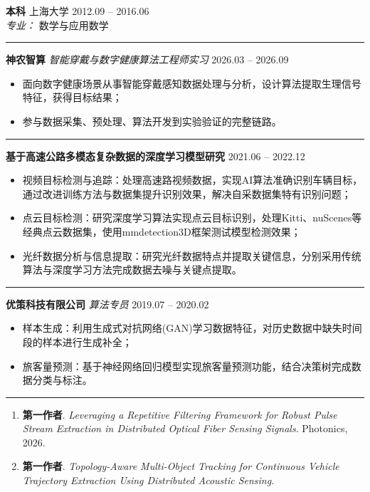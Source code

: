 \documentclass[10pt,a4paper]{ctexart}
\newcommand{\sectiontitle}[1]{\noindent{\large\bfseries\color{mainblue}#1}\vspace{0.2em}\hrule\vspace{0.35em}}
\begin{document}
\noindent
\textbf{本科} \quad 上海大学 \hfill 2012.09 -- 2016.06 \\
\textit{专业：} 数学与应用数学 \\

\sectiontitle{实习经历}
\noindent
\textbf{神农智算} \quad \textit{智能穿戴与数字健康算法工程师实习} \hfill 2026.03 -- 2026.09 \\
\begin{itemize}
\item 面向数字健康场景从事智能穿戴感知数据处理与分析，设计算法提取生理信号特征，获得目标结果；
\item 参与数据采集、预处理、算法开发到实验验证的完整链路。
\end{itemize}

\sectiontitle{科研经历}
\noindent
\textbf{基于高速公路多模态复杂数据的深度学习模型研究} \hfill 2021.06 -- 2022.12 \\
\begin{itemize}
\item 视频目标检测与追踪：处理高速路视频数据，实现AI算法准确识别车辆目标，通过改进训练方法与数据集提升识别效果，解决自采数据集特有识别问题；
\item 点云目标检测：研究深度学习算法实现点云目标识别，处理Kitti、nuScenes等经典点云数据集，使用mmdetection3D框架测试模型检测效果；
\item 光纤数据分析与信息提取：研究光纤数据特点并提取关键信息，分别采用传统算法与深度学习方法完成数据去噪与关键点提取。
\end{itemize}

\sectiontitle{工作经历}
\noindent
\textbf{优策科技有限公司} \quad \textit{算法专员} \hfill 2019.07 -- 2020.02 \\
\begin{itemize}
\item 样本生成：利用生成式对抗网络(GAN)学习数据特征，对历史数据中缺失时间段的样本进行生成补全；
\item 旅客量预测：基于神经网络回归模型实现旅客量预测功能，结合决策树完成数据分类与标注。
\end{itemize}

\sectiontitle{发表文章}
\begin{enumerate}
\item \textbf{第一作者}. \textit{Leveraging a Repetitive Filtering Framework for Robust Pulse Stream Extraction in Distributed Optical Fiber Sensing Signals}. Photonics, 2026.
\item \textbf{第一作者}. \textit{Topology-Aware Multi-Object Tracking for Continuous Vehicle Trajectory Extraction Using Distributed Acoustic Sensing}.
\end{enumerate}
\end{document}
